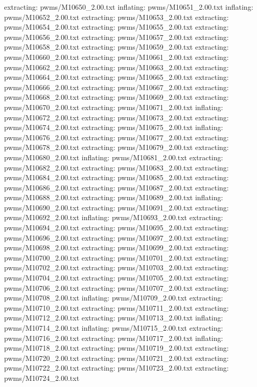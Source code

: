 \documentclass[letterpaper,10pt,english]{sphinxmanual}
\begin{document}
{\begin{sphinxVerbatim}[commandchars=\\\{\}]
 extracting: pwms/M10650\_2.00.txt
  inflating: pwms/M10651\_2.00.txt
  inflating: pwms/M10652\_2.00.txt
 extracting: pwms/M10653\_2.00.txt
 extracting: pwms/M10654\_2.00.txt
 extracting: pwms/M10655\_2.00.txt
 extracting: pwms/M10656\_2.00.txt
 extracting: pwms/M10657\_2.00.txt
 extracting: pwms/M10658\_2.00.txt
 extracting: pwms/M10659\_2.00.txt
 extracting: pwms/M10660\_2.00.txt
 extracting: pwms/M10661\_2.00.txt
 extracting: pwms/M10662\_2.00.txt
 extracting: pwms/M10663\_2.00.txt
 extracting: pwms/M10664\_2.00.txt
 extracting: pwms/M10665\_2.00.txt
 extracting: pwms/M10666\_2.00.txt
 extracting: pwms/M10667\_2.00.txt
 extracting: pwms/M10668\_2.00.txt
 extracting: pwms/M10669\_2.00.txt
 extracting: pwms/M10670\_2.00.txt
 extracting: pwms/M10671\_2.00.txt
  inflating: pwms/M10672\_2.00.txt
 extracting: pwms/M10673\_2.00.txt
 extracting: pwms/M10674\_2.00.txt
 extracting: pwms/M10675\_2.00.txt
  inflating: pwms/M10676\_2.00.txt
 extracting: pwms/M10677\_2.00.txt
 extracting: pwms/M10678\_2.00.txt
 extracting: pwms/M10679\_2.00.txt
 extracting: pwms/M10680\_2.00.txt
  inflating: pwms/M10681\_2.00.txt
 extracting: pwms/M10682\_2.00.txt
 extracting: pwms/M10683\_2.00.txt
 extracting: pwms/M10684\_2.00.txt
 extracting: pwms/M10685\_2.00.txt
 extracting: pwms/M10686\_2.00.txt
 extracting: pwms/M10687\_2.00.txt
 extracting: pwms/M10688\_2.00.txt
 extracting: pwms/M10689\_2.00.txt
  inflating: pwms/M10690\_2.00.txt
 extracting: pwms/M10691\_2.00.txt
 extracting: pwms/M10692\_2.00.txt
  inflating: pwms/M10693\_2.00.txt
 extracting: pwms/M10694\_2.00.txt
 extracting: pwms/M10695\_2.00.txt
 extracting: pwms/M10696\_2.00.txt
 extracting: pwms/M10697\_2.00.txt
 extracting: pwms/M10698\_2.00.txt
 extracting: pwms/M10699\_2.00.txt
 extracting: pwms/M10700\_2.00.txt
 extracting: pwms/M10701\_2.00.txt
 extracting: pwms/M10702\_2.00.txt
 extracting: pwms/M10703\_2.00.txt
 extracting: pwms/M10704\_2.00.txt
 extracting: pwms/M10705\_2.00.txt
 extracting: pwms/M10706\_2.00.txt
 extracting: pwms/M10707\_2.00.txt
 extracting: pwms/M10708\_2.00.txt
  inflating: pwms/M10709\_2.00.txt
 extracting: pwms/M10710\_2.00.txt
 extracting: pwms/M10711\_2.00.txt
 extracting: pwms/M10712\_2.00.txt
 extracting: pwms/M10713\_2.00.txt
  inflating: pwms/M10714\_2.00.txt
  inflating: pwms/M10715\_2.00.txt
 extracting: pwms/M10716\_2.00.txt
 extracting: pwms/M10717\_2.00.txt
  inflating: pwms/M10718\_2.00.txt
 extracting: pwms/M10719\_2.00.txt
 extracting: pwms/M10720\_2.00.txt
 extracting: pwms/M10721\_2.00.txt
 extracting: pwms/M10722\_2.00.txt
 extracting: pwms/M10723\_2.00.txt
 extracting: pwms/M10724\_2.00.txt

\end{sphinxVerbatim}}
\end{document}
